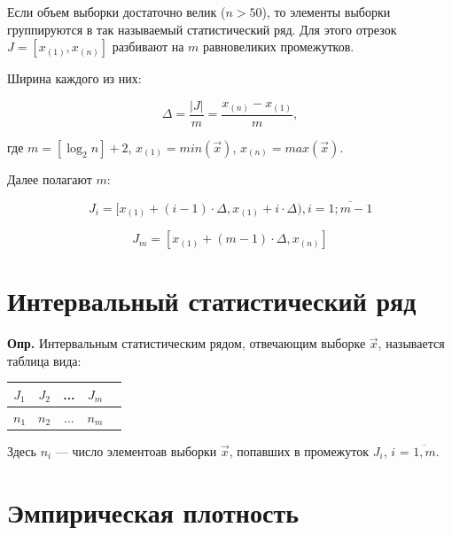 \documentclass[a4paper,14pt, unknownkeysallowed]{extreport}
\begin{document}
Если объем выборки достаточно велик ($n > 50$), то элементы выборки группируются в так называемый статистический ряд. Для этого отрезок\newline $J = [x_{(1)}, x_{(n)}]$ разбивают на $m$ равновеликих промежутков.\newline

Ширина каждого из них:

\begin{equation}
    \Delta = \frac{|J|}{m} = \frac{x_{(n)} - x_{(1)}}{m},
\end{equation}

где $m = [\log_2 n] + 2$, $x_{(1)} = min(\vec x)$, $x_{(n)} = max(\vec x)$.\newline

Далее полагают $m$:

\begin{equation}
    J_i = [x_{(1)} + (i - 1) \cdot \Delta, x_{(1)} + i \cdot \Delta), i = \overline{1; m - 1}
\end{equation}

\begin{equation}
    J_{m} = [x_{(1)} + (m - 1) \cdot \Delta, x_{(n)}]
\end{equation}

\section{Интервальный статистический ряд}

\textbf{Опр.} Интервальным статистическим рядом, отвечающим выборке $\vec x$, называется таблица вида:

\begin{table}[htb]
    \centering
    \begin{tabular}{|c|c|c|c|c|}
        \hline
        $J_1$ & $J_2$ & ... & $J_m$ \\
        \hline
        $n_1$ & $n_2$ & ... & $n_m$ \\
        \hline
    \end{tabular}
\end{table}

Здесь $n_i$ --- число элементоав выборки $\vec x$, попавших в промежуток $J_i$, $i$ = $\overline{1, m}$.

\clearpage

\section{Эмпирическая плотность}
\end{document}
